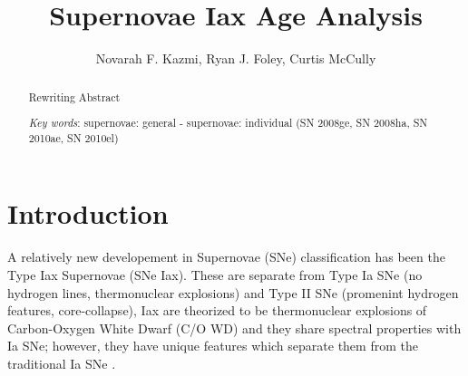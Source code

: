 \documentclass[preprint]{aastex}
\begin{document}
\title{Supernovae Iax Age Analysis}

\author{Novarah F. Kazmi, Ryan J. Foley, Curtis McCully}

\begin{abstract}
\noindent Rewriting Abstract%

\noindent\textit{Key words}: supernovae: general - supernovae: individual (SN 2008ge, SN 2008ha, 
SN 2010ae, SN 2010el)%
\end{abstract}

\section{Introduction}
A relatively new developement in Supernovae (SNe) classification 
has been the Type Iax Supernovae (SNe Iax). 
These are separate from Type Ia SNe (no hydrogen lines, thermonuclear explosions) 
and Type II SNe (promenint hydrogen features, core-collapse), 
Iax are theorized to be thermonuclear explosions of Carbon-Oxygen
White Dwarf (C/O WD) and they share spectral properties with Ia SNe; however,
they have unique features which separate them from the traditional Ia SNe \citep{fol1304}. 
\end{document}
